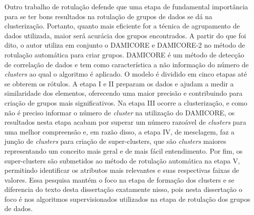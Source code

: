 Outro trabalho de rotulação \cite{Araujo2018} defende que uma etapa de fundamental importância para se ter bons resultados na rotulação de grupos de dados se dá na clusterização. Portanto, quanto mais eficiente for a técnica de agrupamento de dados utilizada, maior será acurácia dos grupos encontrados. A partir do que foi dito, o autor utiliza em conjunto o DAMICORE e DAMICORE-2 no método de rotulação automática para criar grupos. DAMICORE é um método de detecção de correlação de dados e tem como característica a não informação do número de \textit{clusters} ao qual o algoritmo é aplicado. O modelo é dividido em cinco etapas até se obterem os rótulos. A etapa I e II preparam os dados e ajudam a medir a similaridade dos elementos, oferecendo uma maior precisão e contribuindo para criação de grupos mais significativos. Na etapa III ocorre a clusterização, e como não é preciso informar o número de \textit{cluster} na utilização do DAMICORE, os resultados nesta etapa acabam por superar um número razoável de \textit{clusters} para uma melhor compreensão e, em razão disso, a etapa IV, de mesclagem, faz a junção de \textit{clusters} para criação de super-clusters, que são \textit{clusters} maiores representando um conceito mais geral e de mais fácil entendimento. Por fim, os super-clusters são submetidos ao método de rotulação automática na etapa V, permitindo identificar os atributos mais relevantes e suas respectivas faixas de valores. Essa pesquisa mantém o foco na etapa de formação dos clusters e se diferencia do texto desta dissertação exatamente nisso, pois nesta dissertação o foco é nos algoritmos supervisionados utilizados na etapa de rotulação dos grupos de dados. 

